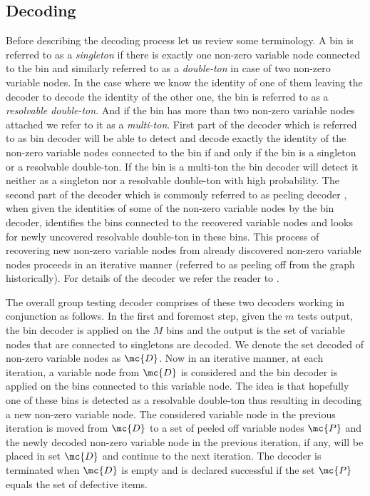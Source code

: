 \documentclass[conference,twocolumn]{IEEEtran}
\begin{document}
\subsection*{Decoding}
Before describing the decoding process let us review some terminology. A bin is referred to as a \textit{singleton} if there is exactly one non-zero variable node connected to the bin and similarly referred to as a \textit{double-ton} in case of two non-zero variable nodes. In the case where we know the identity of one of them leaving the decoder to decode the identity of the other one, the bin is referred to as a \textit{resolvable double-ton}. And if the bin has more than two non-zero variable nodes attached we refer to it as a \textit{multi-ton}. First part of the decoder which is referred to as bin decoder will be able to detect and decode exactly the identity of the non-zero variable nodes connected to the bin if and only if the bin is a singleton or a resolvable double-ton. If the bin is a multi-ton the bin decoder will detect it neither as a singleton nor a resolvable double-ton with high probability. The second part of the decoder which is commonly referred to as peeling decoder \cite{li2015subisit}, when given the identities of some of the non-zero variable nodes by the bin decoder, identifies the bins connected to the recovered variable nodes and looks for newly uncovered resolvable double-ton in these bins. This process of recovering new non-zero variable nodes from already discovered non-zero variable nodes proceeds in an iterative manner (referred to as peeling off from the graph historically). For details of the decoder we refer the reader to \cite{lee2015saffron}.

The overall group testing decoder comprises of these two decoders working in conjunction as follows. In the first and foremost step, given the $m$ tests output, the bin decoder is applied on the $M$ bins and the output is the set of variable nodes that are connected to singletons are decoded. We denote the set decoded of non-zero variable nodes as $\mc{D}$. Now in an iterative manner, at each iteration, a variable node from $\mc{D}$ is considered and the bin decoder is applied on the bins connected to this variable node.
The idea is that hopefully one of these bins is detected as a resolvable double-ton thus resulting in decoding a new non-zero variable node. The considered variable node in the previous iteration is moved from $\mc{D}$ to a set of peeled off variable nodes $\mc{P}$ and the newly decoded non-zero variable node in the previous iteration, if any, will be placed in set $\mc{D}$ and continue to the next iteration. The decoder is terminated when $\mc{D}$ is empty and is declared successful if the set $\mc{P}$ equals the set of defective items. 
\end{document}
